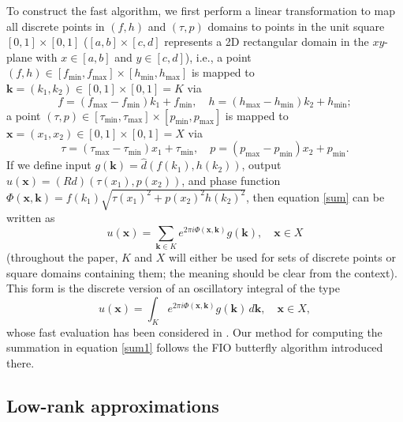 To construct the fast algorithm, we first perform a linear transformation to map all discrete points in $(f,h)$ and $(\tau,p)$ domains to points in the unit square $[0,1]\times[0,1]$ ($[a,b]\times[c,d]$ represents a 2D rectangular domain in the $xy$-plane with $x\in[a,b]$ and $y\in[c,d]$), i.e., a point $(f,h)\in[f_\text{min},f_\text{max}]\times[h_\text{min},h_\text{max}]$ is mapped to $\mathbf{k}=(k_1,k_2)\in[0,1]\times[0,1]=K$ via
\begin{equation}
f=(f_\text{max}-f_\text{min})k_1+f_\text{min}, \quad h=(h_\text{max}-h_\text{min})k_2+h_\text{min};
\end{equation}
a point $(\tau,p)\in[\tau_\text{min},\tau_\text{max}]\times[p_\text{min},p_\text{max}]$ is mapped to $\mathbf{x}=(x_1,x_2)\in[0,1]\times[0,1]=X$ via
\begin{equation}
\tau=(\tau_\text{max}-\tau_\text{min})x_1+\tau_\text{min}, \quad p=(p_\text{max}-p_\text{min})x_2+p_\text{min}.%
\end{equation}
If we define input $g(\mathbf{k})=\hat{d}(f(k_1),h(k_2))$, output $u(\mathbf{x})=(Rd)(\tau(x_1),p(x_2))$, and phase function $\Phi(\mathbf{x},\mathbf{k})=f(k_1)\sqrt{\tau(x_1)^2+p(x_2)^2h(k_2)^2}$, then equation \ref{sum} can be written as 
\begin{equation} \label{sum1}
u(\mathbf{x})=\sum_{\mathbf{k}\in K}  e^{ 2\pi i
\Phi(\mathbf{x},\mathbf{k})}g(\mathbf{k}), \quad \mathbf{x}\in X
\end{equation}
(throughout the paper, $K$ and $X$ will either be used for sets of discrete points or square domains containing them; the meaning should be clear from the context). This form is the discrete version of an oscillatory integral of the type
\begin{equation}
u(\mathbf{x})=\int_K e^{ 2\pi i
\Phi(\mathbf{x},\mathbf{k})}g(\mathbf{k}) \,d\mathbf{k},\quad \mathbf{x}\in X,
\end{equation} %
whose fast evaluation has been considered in \cite{CDY09}. Our method for computing the summation in equation \ref{sum1} follows the FIO butterfly algorithm introduced there.



\subsection{Low-rank approximations}

